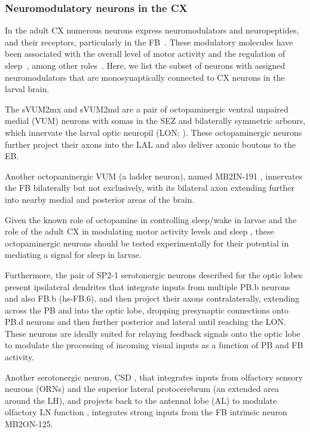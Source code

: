         \subsubsection{Neuromodulatory neurons in the CX}
        In the adult CX numerous neurons express neuromodulators and neuropeptides, and their receptors, particularly in the FB~\citep{kahsai2011neuromodulators, kahsai2012distribution}. These modulatory molecules have been associated with the overall level of motor activity and the regulation of sleep~\citep{donlea2019sleep}, among other roles~\citep{PfeifferHomberg2014}. Here, we list the subset of neurons with assigned neuromodulators that are monosynaptically connected to CX neurons in the larval brain.

        The sVUM2mx and sVUM2md are a pair of octopaminergic ventral unpaired medial (VUM) neurons with somas in the SEZ and bilaterally symmetric arbours, which innervate the larval optic neuropil (LON; \citep{larderet2017opticlobe}).
        These octopaminergic neurons further project their axons into the LAL and also deliver axonic boutons to the EB.

        Another octopaminergic VUM (a ladder neuron), named MB2IN-191 \citep{eschbach2020recurrent}, innervates the FB bilaterally but not exclusively, with its bilateral axon extending further into nearby medial and posterior areas of the brain.

        Given the known role of octopamine in controlling sleep/wake in larvae \citep{szuperak2018sleep} and the role of the adult CX in modulating motor activity levels and sleep \citep{PfeifferHomberg2014, ShaferKeene2021sleep}, these octopaminergic neurons should be tested experimentally for their potential in mediating a signal for sleep in larvae.

        Furthermore, the pair of SP2-1 serotonergic neurons described for the optic lobes \citep{larderet2017opticlobe} present ipsilateral dendrites that integrate inputs from multiple PB.b neurons and also FB.b (hs-FB.6), and then project their axons contralaterally, extending across the PB and into the optic lobe, dropping presynaptic connections onto PB.d neurons and then further posterior and lateral until reaching the LON. These neurons are ideally suited for relaying feedback signals onto the optic lobe to modulate the processing of incoming visual inputs as a function of PB and FB activity.

        Another serotonergic neuron, CSD \citep{berck2016wiring}, that integrates inputs from olfactory sensory neurons (ORNs) and the superior lateral protocerebrum (an extended area around the LH), and projects back to the antennal lobe (AL) to modulate olfactory LN function \citep{vogt2021internalstate}, integrates strong inputs from the FB intrinsic neuron MB2ON-125.

